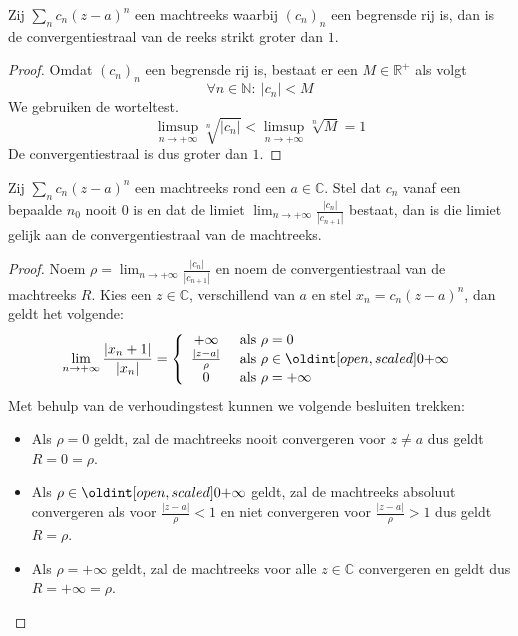 \documentclass[main.tex]{subfiles}
\begin{document}

\begin{st}
  Zij $\sum_{n}c_{n}(z-a)^{n}$ een machtreeks waarbij $(c_{n})_{n}$ een begrensde rij is, dan is de convergentiestraal van de reeks strikt groter dan $1$.

  \begin{proof}
    Omdat $(c_{n})_{n}$ een begrensde rij is, bestaat er een $M\in\mathbb{R}^{+}$ als volgt
    \[ \forall n\in\mathbb{N}:\ |c_{n}| < M \]
    We gebruiken de worteltest.
    \[ \limsup_{n\rightarrow +\infty}\sqrt[n]{|c_{n}|} < \limsup_{n\rightarrow +\infty}\sqrt[n]{M} = 1 \]
    De convergentiestraal is dus groter dan $1$.
  \end{proof}
\end{st}

\begin{bpr}
  \label{pr:convergentiestraal-adhv-limiet}
  Zij $\sum_{n}c_{n}(z-a)^{n}$ een machtreeks rond een $a\in \mathbb{C}$.
  Stel dat $c_{n}$ vanaf een bepaalde $n_{0}$ nooit $0$ is en dat de limiet $\lim_{n \rightarrow +\infty}\frac{|c_{n}|}{|c_{n+1}|}$ bestaat, dan is die limiet gelijk aan de convergentiestraal van de machtreeks.

  \begin{proof}
    Noem $\rho = \lim_{n\rightarrow +\infty}\frac{|c_{n}|}{|c_{n+1}|}$ en noem de convergentiestraal van de machtreeks $R$.
    Kies een $z\in \mathbb{C}$, verschillend van $a$ en stel $x_{n} = c_{n}(z-a)^{n}$, dan geldt het volgende:
    \[
    \lim_{n\rightarrow +\infty}\frac{|x_{n}+1|}{|x_{n}|} = 
    \left\{
      \begin{array}{cl}
        +\infty & \text{ als } \rho = 0\\
        \frac{|z-a|}{\rho} & \text{ als } \rho \in \interval[open]{0}{+\infty}\\
        0 & \text{ als } \rho = +\infty\\
      \end{array}
    \right.
    \]
    Met behulp van de verhoudingstest kunnen we volgende besluiten trekken:
    \begin{itemize}
    \item Als $\rho=0$ geldt, zal de machtreeks nooit convergeren voor $z \neq a$ dus geldt $R=0=\rho$.
    \item Als $\rho \in \interval[open]{0}{+\infty}$ geldt, zal de machtreeks absoluut convergeren als voor $\frac{|z-a|}{\rho}<1$ en niet convergeren voor $\frac{|z-a|}{\rho} >1$ dus geldt $R = \rho$.
    \item Als $\rho=+\infty$ geldt, zal de machtreeks voor alle $z\in \mathbb{C}$ convergeren en geldt dus $R = +\infty = \rho$.
    \end{itemize}
  \end{proof}
\end{bpr}
\end{document}
